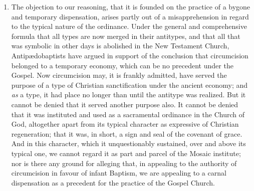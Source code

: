 \documentclass[english,]{book}
\providecommand{\tightlist}{%
  \setlength{\itemsep}{0pt}\setlength{\parskip}{0pt}}
\begin{document}
\begin{enumerate}
\def\labelenumi{\arabic{enumi}.}
\setcounter{enumi}{1}
\tightlist
\item
  The objection to our reasoning, that it is founded on the practice of a bygone and temporary dispensation, arises partly out of a misapprehension in regard to the typical nature of the ordinance. Under the general and comprehensive formula that all types are now merged in their antitypes, and that all that was symbolic in other days is abolished in the New Testament Church, Antipædobaptists have argued in support of the conclusion that circumcision belonged to a temporary economy, which can be no precedent under the Gospel. Now circumcision may, it is frankly admitted, have served the purpose of a type of Christian sanctification under the ancient economy; and \emph{as} a type, it had place no longer than until the antitype was realized. But it cannot be denied that it served another purpose also. It cannot be denied that it was instituted and used as a sacramental ordinance in the Church of God, altogether apart from its typical character as expressive of Christian regeneration; that it was, in short, a sign and seal of the covenant of grace. And in this character, which it unquestionably sustained, over and above its typical one, we cannot regard it as part and parcel of the Mosaic institute; nor is there any ground for alleging that, in appealing to the authority of circumcision in favour of infant Baptism, we are appealing to a carnal dispensation as a precedent for the practice of the Gospel Church.
\end{enumerate}
\end{document}
